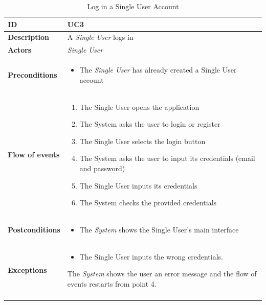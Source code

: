 \documentclass[titlepage]{article}
\begin{document}
\begin{longtable}{| p{3 cm} | p{10 cm} |} 
			\hline
			{\bf ID} & UC3 \\
			\hline
			{\bf Description} & A {\it Single User} logs in\\
			\hline
			{\bf Actors} & {\it Single User} \\
			\hline
			{\bf Preconditions} & 		
							\begin{itemize}
								\item The {\it Single User}  has already created a Single User account 
							\end{itemize}
			\\
			\hline
			{\bf Flow of events} & 
							\begin{enumerate}
								\item The Single User opens the application
								\item The System asks the user to login or register
								\item The Single User selects the login button
								\item The System asks the user to input its credentials (email and password)
								\item The Single User inputs its credentials
								\item The System checks the provided credentials

							\end{enumerate}
			
			 \\
			\hline
			{\bf Postconditions} & 
							\begin{itemize}
								\item The {\it System} shows the Single User’s main interface
							\end{itemize}
			\\
			\hline
			{\bf Exceptions} & 
							\begin{itemize}
								\item The Single User inputs the wrong credentials. 
							\end{itemize}
							The {\it System} shows the user an error message and the flow of events 							restarts from point 4.
							
			\\
			\hline
			\caption{Log in a Single User Account}
			\end{longtable}
\end{document}
